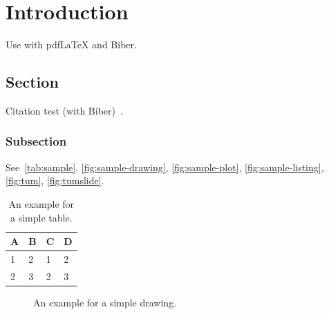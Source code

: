 
\chapter{Introduction}\label{chapter:introduction}
Use with pdfLaTeX and Biber.

\section{Section}
Citation test (with Biber)~\parencite{latex}.

\subsection{Subsection}

See~\autoref{tab:sample}, \autoref{fig:sample-drawing}, \autoref{fig:sample-plot}, \autoref{fig:sample-listing}, \autoref{fig:tum}, \autoref{fig:tumslide}.

\begin{table}[htpb]
    \caption[Example table]{An example for a simple table.}\label{tab:sample}
    \centering
    \begin{tabular}{l l l l}
        \toprule
        A & B & C & D \\
        \midrule
        1 & 2 & 1 & 2 \\
        2 & 3 & 2 & 3 \\
        \bottomrule
    \end{tabular}
\end{table}

\begin{figure}[htpb]
    \centering
    \caption[Example drawing]{An example for a simple drawing.}\label{fig:sample-drawing}
\end{figure}

